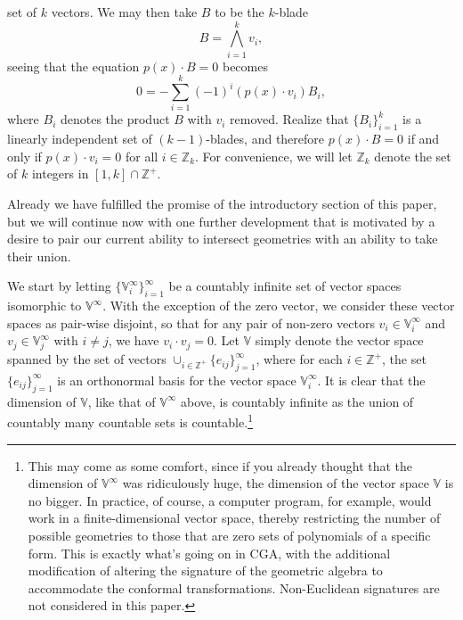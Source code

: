 \documentclass{birkjour}
\theoremstyle{definition}
\theoremstyle{remark}
\numberwithin{equation}{section}
\newcommand{\V}{\mathbb{V}}
\newcommand{\Z}{\mathbb{Z}}
\begin{document}
set of $k$ vectors.
We may then take $B$ to be the $k$-blade
\begin{equation}
B=\bigwedge_{i=1}^k v_i,
\end{equation}
seeing that the equation $p(x)\cdot B=0$ becomes
\begin{equation}
0 = -\sum_{i=1}^k (-1)^i(p(x)\cdot v_i)B_i,
\end{equation}
where $B_i$ denotes the product $B$ with $v_i$ removed.  Realize
that $\{B_i\}_{i=1}^k$ is a linearly independent set of $(k-1)$-blades,
and therefore $p(x)\cdot B=0$ if and only if $p(x)\cdot v_i=0$ for all $i\in\Z_k$.
For convenience, we will let $\Z_k$ denote the set of $k$ integers in $[1,k]\cap\Z^+$.

Already we have fulfilled the promise of the introductory section of this paper,
but we will continue now with one further development that is motivated by a desire
to pair our current ability to intersect geometries with an ability to take their union.

We start by letting $\{\V_i^\infty\}_{i=1}^\infty$ be a countably infinite set of
vector spaces isomorphic to $\V^\infty$.  With the exception of the zero vector,
we consider these vector spaces as pair-wise disjoint, so that for any pair of non-zero
vectors $v_i\in\V_i^\infty$ and $v_j\in\V_j^\infty$ with $i\neq j$, we have $v_i\cdot v_j=0$.
Let $\V$ simply denote the vector space spanned by the set of vectors $\cup_{i\in\Z^+}\{e_{ij}\}_{j=1}^\infty$,
where for each $i\in\Z^+$, the set $\{e_{ij}\}_{j=1}^\infty$ is an orthonormal basis for
the vector space $\V_i^\infty$.
It is clear that the dimension of $\V$,
like that of $\V^\infty$ above, is countably infinite as the union of countably many countable
sets is countable.\footnote{This may come as some comfort, since if you already thought that
the dimension of $\V^\infty$ was ridiculously huge, the dimension of the vector space $\V$ is no bigger.
In practice, of course, a computer
program, for example, would work in a finite-dimensional vector space, thereby restricting
the number of possible geometries to those that are zero sets of polynomials of a specific form.
This is exactly what's going on in CGA, with the additional modification of altering the signature
of the geometric algebra to accommodate the conformal transformations.  Non-Euclidean signatures
are not considered in this paper.}
\end{document}
